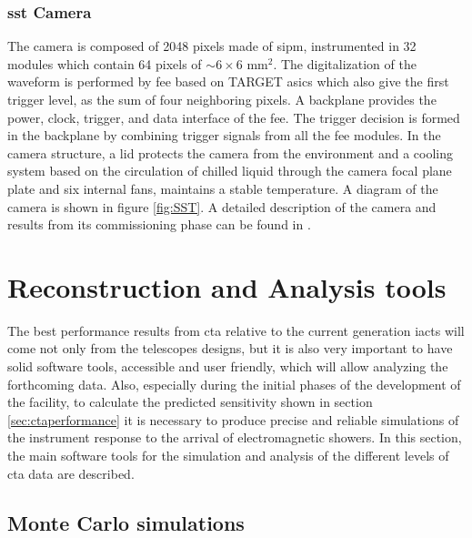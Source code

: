 \documentclass[main.tex]{subfiles}
\begin{document}
\subsubsection{\gls{sst} Camera}

The camera is composed of 2048 pixels made of \gls{sipm}, instrumented in 32 modules which contain 64 pixels of $\sim 6\times6$ mm$^2$. The digitalization of the waveform is performed by \gls{fee} based on TARGET \glspl{asic} \cite{2017TARGETASIC} which also give the first trigger level, as the sum of four neighboring pixels. A backplane provides the power, clock, trigger, and data interface of the \gls{fee}. The trigger decision is formed in the backplane by combining trigger signals from all the \gls{fee} modules. In the camera structure, a lid protects the camera from the environment and a cooling system based on the circulation of chilled liquid through the camera focal plane plate and six internal fans, maintains a stable temperature. A diagram of the camera is shown in figure \ref{fig:SST}. A detailed description of the camera and results from its commissioning phase can be found in \cite{2017CHECcam}.

\section{Reconstruction and Analysis tools} \label{sec:ctaanalysis}

The best performance results from \gls{cta} relative to the current generation \glspl{iact} will come not only from the telescopes designs, but it is also very important to have solid software tools, accessible and user friendly, which will allow analyzing the forthcoming data. Also, especially during the initial phases of the development of the facility, to calculate the predicted sensitivity shown in section \ref{sec:ctaperformance} it is necessary to produce precise and reliable simulations of the instrument response to the arrival of electromagnetic showers. In this section, the main software tools for the simulation and analysis of the different levels of \gls{cta} data are described.

\subsection{Monte Carlo simulations}
\end{document}

